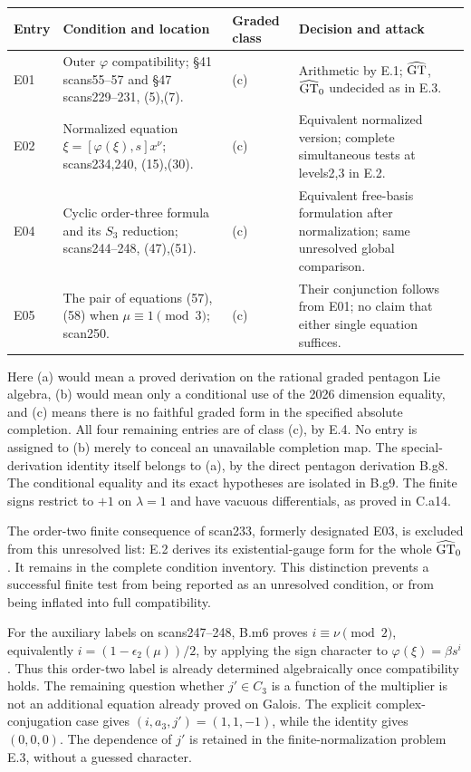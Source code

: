 \begin{longtable}{p{}p{}p{}p{}}
\toprule
Entry&Condition and location&Graded class&Decision and attack\\\midrule\endhead
E01&Outer $\varphi$ compatibility; \S41 scans55--57 and \S47 scans229--231, (5),(7).& (c)&Arithmetic by E.1; $\widehat{\mathrm{GT}}$, $\widehat{\mathrm{GT}}_0$ undecided as in E.3.\\
E02&Normalized equation $\xi=[\varphi(\xi),s]x^\nu$; scans234,240, (15),(30).&(c)&Equivalent normalized version; complete simultaneous tests at levels2,3 in E.2.\\
E04&Cyclic order-three formula and its $S_3$ reduction; scans244--248, (47),(51).&(c)&Equivalent free-basis formulation after normalization; same unresolved global comparison.\\
E05&The pair of equations (57),(58) when $\mu\equiv1\pmod3$; scan250.&(c)&Their conjunction follows from E01; no claim that either single equation suffices.\\
\bottomrule
\end{longtable}
Here (a) would mean a proved derivation on the rational graded
pentagon Lie algebra, (b) would mean only a conditional use of the
2026 dimension equality, and (c) means there is no faithful graded
form in the specified absolute completion. All four remaining entries
are of class (c), by E.4. No entry is assigned to (b) merely to conceal
an unavailable completion map. The special-derivation identity itself
belongs to (a), by the direct pentagon derivation B.g8. The conditional
equality and its exact hypotheses are isolated in B.g9. The finite
signs restrict to $+1$ on $\lambda=1$ and have vacuous differentials,
as proved in C.a14.

The order-two finite consequence of scan233, formerly designated E03,
is excluded from this unresolved list: E.2 derives its existential-gauge
form for the whole $\widehat{\mathrm{GT}}_0$. It remains in the complete condition inventory.
This distinction prevents a successful finite test from being reported
as an unresolved condition, or from being inflated into full compatibility.

For the auxiliary labels on scans247--248, B.m6 proves
$i\equiv\nu\pmod2$, equivalently
$i=(1-\epsilon_2(\mu))/2$, by applying the sign character to
$\varphi(\xi)=\beta s^i$. Thus this order-two label is already
determined algebraically once compatibility holds. The remaining
question whether $j'\in C_3$ is a function of the multiplier is not
an additional equation already proved on Galois. The explicit
complex-conjugation case gives $(i,a_3,j')=(1,1,-1)$, while the
identity gives $(0,0,0)$. The dependence of $j'$ is retained in the
finite-normalization problem E.3, without a guessed character.

